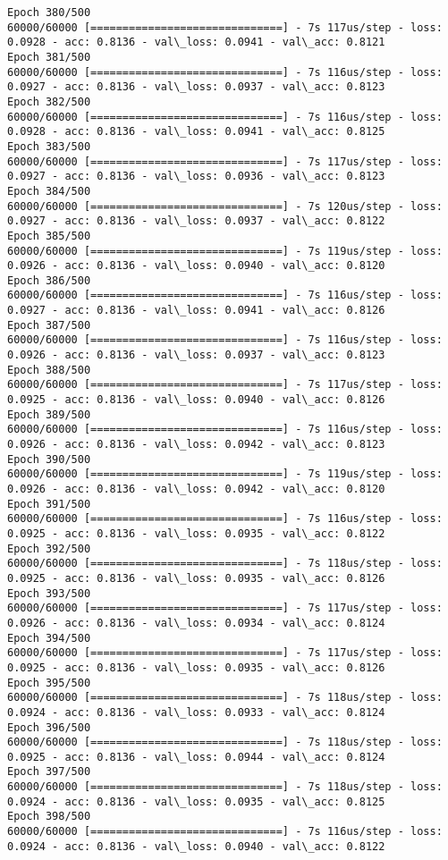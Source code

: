 \documentclass[11pt]{article}
\begin{document}
\begin{Verbatim}[commandchars=\\\{\}]
Epoch 380/500
60000/60000 [==============================] - 7s 117us/step - loss: 0.0928 - acc: 0.8136 - val\_loss: 0.0941 - val\_acc: 0.8121
Epoch 381/500
60000/60000 [==============================] - 7s 116us/step - loss: 0.0927 - acc: 0.8136 - val\_loss: 0.0937 - val\_acc: 0.8123
Epoch 382/500
60000/60000 [==============================] - 7s 116us/step - loss: 0.0928 - acc: 0.8136 - val\_loss: 0.0941 - val\_acc: 0.8125
Epoch 383/500
60000/60000 [==============================] - 7s 117us/step - loss: 0.0927 - acc: 0.8136 - val\_loss: 0.0936 - val\_acc: 0.8123
Epoch 384/500
60000/60000 [==============================] - 7s 120us/step - loss: 0.0927 - acc: 0.8136 - val\_loss: 0.0937 - val\_acc: 0.8122
Epoch 385/500
60000/60000 [==============================] - 7s 119us/step - loss: 0.0926 - acc: 0.8136 - val\_loss: 0.0940 - val\_acc: 0.8120
Epoch 386/500
60000/60000 [==============================] - 7s 116us/step - loss: 0.0927 - acc: 0.8136 - val\_loss: 0.0941 - val\_acc: 0.8126
Epoch 387/500
60000/60000 [==============================] - 7s 116us/step - loss: 0.0926 - acc: 0.8136 - val\_loss: 0.0937 - val\_acc: 0.8123
Epoch 388/500
60000/60000 [==============================] - 7s 117us/step - loss: 0.0925 - acc: 0.8136 - val\_loss: 0.0940 - val\_acc: 0.8126
Epoch 389/500
60000/60000 [==============================] - 7s 116us/step - loss: 0.0926 - acc: 0.8136 - val\_loss: 0.0942 - val\_acc: 0.8123
Epoch 390/500
60000/60000 [==============================] - 7s 119us/step - loss: 0.0926 - acc: 0.8136 - val\_loss: 0.0942 - val\_acc: 0.8120
Epoch 391/500
60000/60000 [==============================] - 7s 116us/step - loss: 0.0925 - acc: 0.8136 - val\_loss: 0.0935 - val\_acc: 0.8122
Epoch 392/500
60000/60000 [==============================] - 7s 118us/step - loss: 0.0925 - acc: 0.8136 - val\_loss: 0.0935 - val\_acc: 0.8126
Epoch 393/500
60000/60000 [==============================] - 7s 117us/step - loss: 0.0926 - acc: 0.8136 - val\_loss: 0.0934 - val\_acc: 0.8124
Epoch 394/500
60000/60000 [==============================] - 7s 117us/step - loss: 0.0925 - acc: 0.8136 - val\_loss: 0.0935 - val\_acc: 0.8126
Epoch 395/500
60000/60000 [==============================] - 7s 118us/step - loss: 0.0924 - acc: 0.8136 - val\_loss: 0.0933 - val\_acc: 0.8124
Epoch 396/500
60000/60000 [==============================] - 7s 118us/step - loss: 0.0925 - acc: 0.8136 - val\_loss: 0.0944 - val\_acc: 0.8124
Epoch 397/500
60000/60000 [==============================] - 7s 118us/step - loss: 0.0924 - acc: 0.8136 - val\_loss: 0.0935 - val\_acc: 0.8125
Epoch 398/500
60000/60000 [==============================] - 7s 116us/step - loss: 0.0924 - acc: 0.8136 - val\_loss: 0.0940 - val\_acc: 0.8122

\end{Verbatim}
\end{document}
